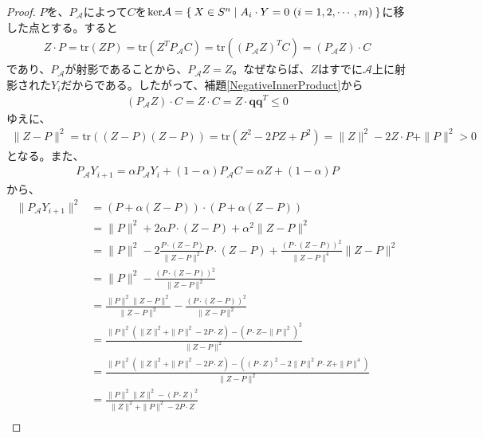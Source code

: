 \begin{proof}
  $P$を、$P_\mathcal{A}$によって$C$を$\mathrm{ker} \mathcal{A} = \Set{X \in S^n | A_i \cdot Y = 0 \,\,(i = 1, 2, \cdots, m)}$に移した点とする。すると
  \begin{align*}
    Z \cdot P = \mathrm{tr}(Z P) = \mathrm{tr}(Z^T P_\mathcal{A} C) = \mathrm{tr}((P_\mathcal{A} Z)^T C) = (P_\mathcal{A} Z) \cdot C
  \end{align*}
  であり、$P_\mathcal{A}$が射影であることから、$P_\mathcal{A} Z = Z$。なぜならば、$Z$はすでに$\mathcal{A}$上に射影された$Y_i$だからである。したがって、補題\ref{NegativeInnerProduct}から
  \begin{align*}
    (P_\mathcal{A} Z) \cdot C = Z \cdot C = Z \cdot \mathbf{q} \mathbf{q}^T \leq 0
  \end{align*}
  ゆえに、
  \begin{align*}
    \|Z - P\|^2 = \mathrm{tr}((Z - P)(Z - P)) = \mathrm{tr}(Z^2 - 2 P Z + P^2) = \|Z\|^2 - 2 Z \cdot P + \|P\|^2 > 0
  \end{align*}
  となる。また、
  \begin{align*}
    P_\mathcal{A} Y_{i + 1} = \alpha P_\mathcal{A} Y_i + (1 - \alpha) P_\mathcal{A} C = \alpha Z + (1 - \alpha) P
  \end{align*}
  から、
  \begin{align*}
    \|P_\mathcal{A} Y_{i + 1}\|^2 & = (P + \alpha (Z - P)) \cdot (P + \alpha (Z - P)) \\
                                  & = \|P\|^2 + 2 \alpha P \cdot (Z - P) + \alpha^2 \|Z - P\|^2 \\
                                  & = \|P\|^2 - 2 \frac{P \cdot (Z - P)}{\|Z - P\|^2} P \cdot (Z - P) + \frac{(P \cdot (Z - P))^2}{\|Z - P\|^4} \|Z - P\|^2 \\
                                  & = \|P\|^2 - \frac{(P \cdot (Z - P))^2}{\|Z - P\|^2} \\
                                  & = \frac{\|P\|^2 \|Z - P\|^2}{\|Z - P\|^2} - \frac{(P \cdot (Z - P))^2}{\|Z - P\|^2} \\
                                  & = \frac{\|P\|^2 (\|Z\|^2 + \|P\|^2 - 2 P \cdot Z) - (P \cdot Z - \|P\|^2)^2}{\|Z - P\|^2} \\
                                  & = \frac{\|P\|^2 (\|Z\|^2 + \|P\|^2 - 2 P \cdot Z) - ((P \cdot Z)^2 - 2 \|P\|^2 P \cdot Z + \|P\|^4)}{\|Z - P\|^2} \\
                                  & = \frac{\|P\|^2 \|Z\|^2 - (P \cdot Z)^2}{\|Z\|^2 + \|P\|^2 - 2 P \cdot Z} \\

\end{align*}
\end{proof}
